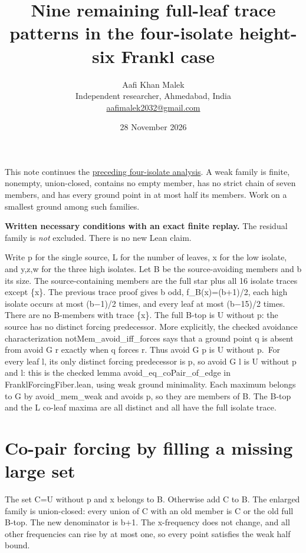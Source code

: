 \documentclass[11pt,letterpaper]{article}
\title{Nine remaining full-leaf trace patterns in the four-isolate height-six Frankl case}
\author{Aafi Khan Malek\\ \small Independent researcher, Ahmedabad, India\\
\small\href{mailto:aafimalek2032@gmail.com}{aafimalek2032@gmail.com}}
\date{28 November 2026}
\begin{document}
\maketitle
This note continues the
\href{https://github.com/Aafimalek/novel-discoveries/tree/0e7028693b3320939007ed50f57f319520ca7c67/frankl-height-six/verification/exactly-four-isolates}{preceding four-isolate analysis}.
A weak family is finite, nonempty, union-closed, contains no empty member,
has no strict chain of seven members, and has every ground point in
at most half its members. Work on a smallest ground among such families.

\textbf{Written necessary conditions with an exact finite replay.} The
residual family is \emph{not} excluded. There is no new Lean claim.

Write p for the single source, L for the number of leaves, x for the low
isolate, and y,z,w for the three high isolates. Let B be the
source-avoiding members and b its size. The source-containing members
are the full star plus all 16 isolate traces except \{x\}. The previous
trace proof gives b odd, f\_B(x)=(b+1)/2, each high isolate occurs at
most (b−1)/2 times, and every leaf at most (b−15)/2 times. There are no
B-members with trace \{x\}. The full B-top is U without p: the source
has no distinct forcing predecessor. More explicitly, the checked
avoidance characterization notMem\_avoid\_iff\_forces says that a ground
point q is absent from avoid G r exactly when q forces r. Thus avoid G p
is U without p.~For every leaf l, its only distinct forcing predecessor
is p, so avoid G l is U without p and l: this is the checked lemma
avoid\_eq\_coPair\_of\_edge in FranklForcingFiber.lean, using weak
ground minimality. Each maximum belongs to G by avoid\_mem\_weak and
avoids p, so they are members of B. The B-top and the L co-leaf maxima
are all distinct and all have the full isolate trace.

\section{Co-pair forcing by filling a missing large
set}\label{co-pair-forcing-by-filling-a-missing-large-set}

The set C=U without p and x belongs to B. Otherwise add C to B. The
enlarged family is union-closed: every union of C with an old member is
C or the old full B-top. The new denominator is b+1. The x-frequency
does not change, and all other frequencies can rise by at most one, so
every point satisfies the weak half bound.
\end{document}
